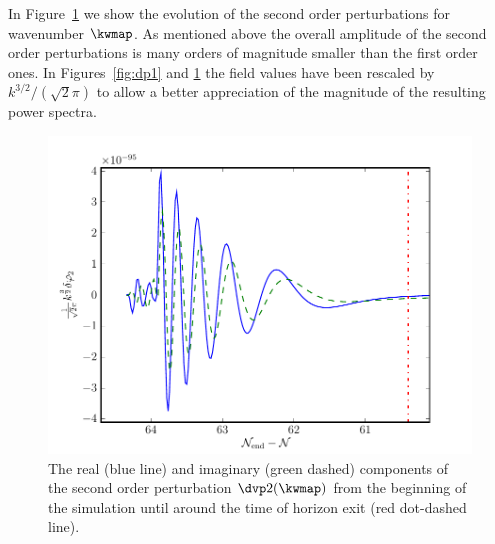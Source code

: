In Figure~\ref{fig:dp2realimag} we show the evolution of the second
order perturbations for wavenumber $\kwmap$. As mentioned above the
overall amplitude of the second order perturbations is many orders of
magnitude smaller than the first order ones. In Figures~\ref{fig:dp1}
and \ref{fig:dp2realimag} the field values have been rescaled by
$k^{3/2}/(\sqrt{2}\pi)$ to allow a better appreciation of the
magnitude of the resulting power spectra.
% 
\begin{figure}
 \centering
 \includegraphics[scale=0.8]{numerical/graphs/dp2_kwmap}
 \caption{The real (blue line) and imaginary (green dashed) components of the
second order
perturbation $\dvp2(\kwmap)$ from the beginning of the simulation until around
the time
of horizon exit (red dot-dashed line).}
\label{fig:dp2realimag}
\end{figure}
% 



